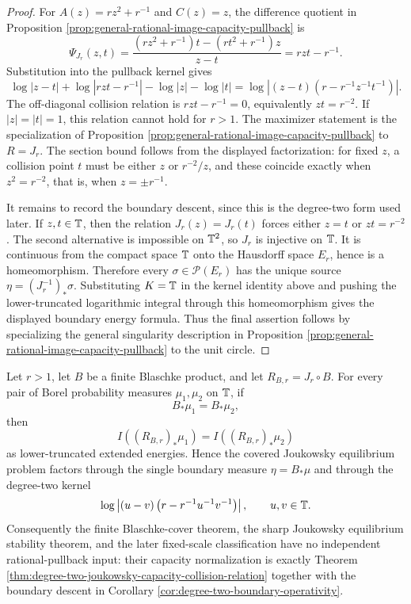 \begin{proof}
For \(A(z)=rz^2+r^{-1}\) and \(C(z)=z\), the difference quotient in Proposition \ref{prop:general-rational-image-capacity-pullback} is
\[
\Psi_{J_r}(z,t)=\frac{(rz^2+r^{-1})t-(rt^2+r^{-1})z}{z-t}
=rzt-r^{-1}.
\]
Substitution into the pullback kernel gives
\[
\log|z-t|+
\log|rzt-r^{-1}|-
\log|z|-
\log|t|
=
\log\left|(z-t)\left(r-r^{-1}z^{-1}t^{-1}\right)\right|.
\]
The off-diagonal collision relation is \(rzt-r^{-1}=0\), equivalently \(zt=r^{-2}\).  If \(|z|=|t|=1\), this relation cannot hold for \(r>1\).  The maximizer statement is the specialization of Proposition \ref{prop:general-rational-image-capacity-pullback} to \(R=J_r\).  The section bound follows from the displayed factorization: for fixed \(z\), a collision point \(t\) must be either \(z\) or \(r^{-2}/z\), and these coincide exactly when \(z^2=r^{-2}\), that is, when \(z=\pm r^{-1}\).

It remains to record the boundary descent, since this is the degree-two form used later.  If \(z,t\in\mathbb{T}\), then the relation \(J_r(z)=J_r(t)\) forces either \(z=t\) or \(zt=r^{-2}\).  The second alternative is impossible on \(\mathbb{T}^2\), so \(J_r\) is injective on \(\mathbb{T}\).  It is continuous from the compact space \(\mathbb{T}\) onto the Hausdorff space \(E_r\), hence is a homeomorphism.  Therefore every \(\sigma\in\mathcal P(E_r)\) has the unique source \(\eta=(J_r^{-1})_\ast\sigma\).  Substituting \(K=\mathbb{T}\) in the kernel identity above and pushing the lower-truncated logarithmic integral through this homeomorphism gives the displayed boundary energy formula.  Thus the final assertion follows by specializing the general singularity description in Proposition \ref{prop:general-rational-image-capacity-pullback} to the unit circle.
\end{proof}

\begin{corollary}\label{cor:primary-joukowsky-capacity-chain}
Let \(r>1\), let \(B\) be a finite Blaschke product, and let \(R_{B,r}=J_r\circ B\).  For every pair of Borel probability measures \(\mu_1,\mu_2\) on \(\mathbb{T}\), if
\[
B_\ast\mu_1=B_\ast\mu_2,
\]
then
\[
I((R_{B,r})_\ast\mu_1)=I((R_{B,r})_\ast\mu_2)
\]
as lower-truncated extended energies.  Hence the covered Joukowsky equilibrium problem factors through the single boundary measure \(\eta=B_\ast\mu\) and through the degree-two kernel
\[
\log\left|(u-v)\left(r-r^{-1}u^{-1}v^{-1}\right)\right|,
\qquad u,v\in\mathbb{T}.
\]
Consequently the finite Blaschke-cover theorem, the sharp Joukowsky equilibrium stability theorem, and the later fixed-scale classification have no independent rational-pullback input: their capacity normalization is exactly Theorem \ref{thm:degree-two-joukowsky-capacity-collision-relation} together with the boundary descent in Corollary \ref{cor:degree-two-boundary-operativity}.
\end{corollary}

